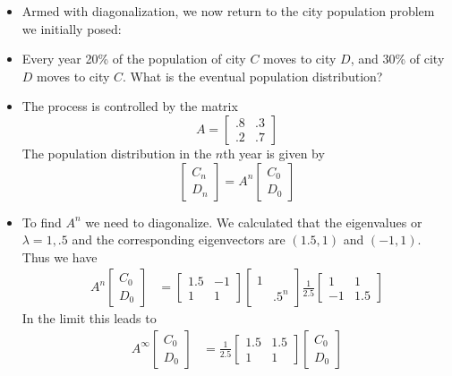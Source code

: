 \documentclass[11pt,oneside]{amsbook}
\theoremstyle{definition}
\theoremstyle{plain}
\theoremstyle{definition}
\theoremstyle{remark}
\numberwithin{equation}{section}
\numberwithin{figure}{section}
\begin{document}
\begin{itemize}
\item Armed with diagonalization, we now return to the city population problem we initially posed:
\item Every year 20\% of the population of city $C$ moves to city $D$, and 30\% of city $D$ moves to city $C$. What is the eventual population distribution?
\item The process is controlled by the matrix
  \[A=\begin{bmatrix}.8&.3\\.2&.7\end{bmatrix}
  \]
  The population distribution in the $n$th year is given by
  \[\begin{bmatrix}C_n\\D_n\end{bmatrix}
    =A^n\begin{bmatrix}C_0\\D_0\end{bmatrix}
  \]
\item To find $A^n$ we need to diagonalize. We calculated that the eigenvalues or $\lambda=1,.5$ and the corresponding eigenvectors are $(1.5,1)$ and $(-1,1)$. Thus we have
  \begin{align*}
    A^n\begin{bmatrix}C_0\\D_0\end{bmatrix}
    &=\begin{bmatrix}1.5&-1\\1&1\end{bmatrix}
      \begin{bmatrix}1\\&.5^n\end{bmatrix}
      \frac{1}{2.5}
      \begin{bmatrix}1&1\\-1&1.5\end{bmatrix}
  \end{align*}
  In the limit this leads to
  \begin{align*}
    A^\infty\begin{bmatrix}C_0\\D_0\end{bmatrix}
    &=\frac{1}{2.5}\begin{bmatrix}1.5&1.5\\1&1\end{bmatrix}
       \begin{bmatrix}C_0\\D_0\end{bmatrix}\\

\end{align*}
\end{itemize}
\end{document}

